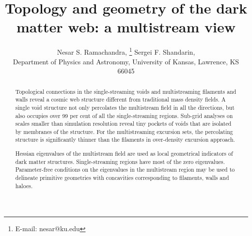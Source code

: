 \documentclass[fleqn,usenatbib,useAMS]{mnras}
\begin{document}
\label{firstpage}
\pagerange{\pageref{firstpage}--\pageref{lastpage}}

\title[Topology and geometry of the dark matter web]{Topology and geometry of the dark matter web: a multistream view}

\author[Ramachandra \& Shandarin]
	{Nesar S. Ramachandra, \thanks{E-mail: nesar@ku.edu} 
	Sergei F. Shandarin, \\
	Department of Physics and Astronomy, University of Kansas, Lawrence, KS 66045}



\maketitle
\begin{abstract}

Topological connections in the single-streaming voids and multistreaming filaments and walls reveal a cosmic web structure different from traditional mass density fields. A single void structure not only percolates the multistream field in all the directions, but also occupies over 99 per cent of all the single-streaming regions. Sub-grid analyses on scales smaller than simulation resolution reveal tiny pockets of voids that are isolated by membranes of the structure. For the multistreaming excursion sets, the percolating structure is significantly  thinner than the filaments in over-density excursion approach.  

Hessian eigenvalues of the multistream field are used as local geometrical indicators of dark matter structures. Single-streaming regions have most of the zero eigenvalues. Parameter-free conditions on the eigenvalues in the multistream region may be used to delineate primitive geometries with concavities corresponding to filaments, walls and haloes.

\end{abstract}
\end{document}

